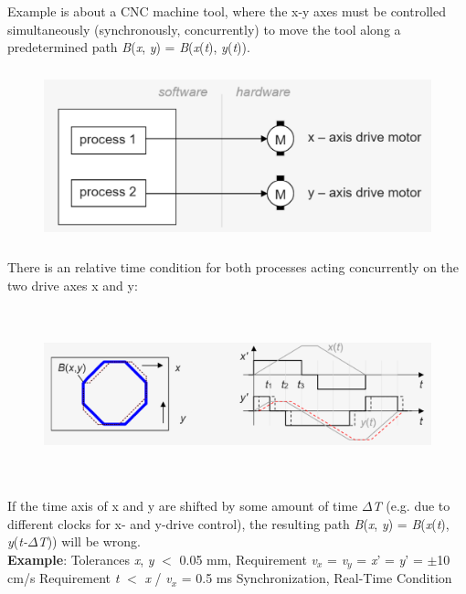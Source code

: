 Example is about a CNC machine tool, where the x-y axes must be controlled simultaneously (synchronously, concurrently) to move the tool along a predetermined path \textit{B}(\textit{x}, \textit{y}) = \textit{B}(\textit{x}(\textit{t}), \textit{y}(\textit{t})). 

	\begin{figure}[h]
    \centering
    \includegraphics[width=12cm, height=5cm]{Images/image68.png}
    \label{fig:Fig }
    \end{figure}

There is an relative time condition for both processes acting concurrently on the two drive axes x and y:

	\begin{figure}[h]
    \centering
    \includegraphics[width=14cm, height=5cm]{Images/image69.png}
    \label{fig:Fig }
    \end{figure}

If the time axis of x and y are shifted by some amount of time $\Delta$\textit{T} (e.g. due to different clocks for x- and y-drive control), the resulting path \textit{B}(\textit{x}, \textit{y}) = \textit{B}(\textit{x}(\textit{t}), \textit{y}(\textit{t-}$\Delta$\textit{T})) will be wrong.\\

\textbf{Example}: Tolerances {\textbar}\textit{x}{\textbar}, {\textbar}\textit{y}{\textbar} $\mathrm{<}$ 0.05 mm,   Requirement    \textit{v${}_{x}$} = \textit{v${}_{y}$} = \textit{x}' = \textit{y}' = $\mathrm{\pm}$10 cm/s     Requirement     {\textbar}\textit{t}{\textbar} $\mathrm{<}$ {\textbar}\textit{x}{\textbar} / {\textbar}\textit{v${}_{x}$}{\textbar} = 0.5 ms       Synchronization, Real-Time Condition

